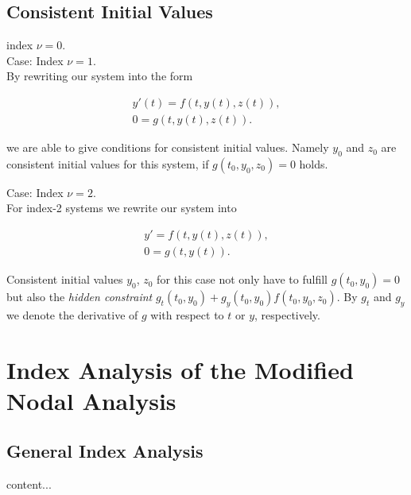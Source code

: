 	\subsection{Consistent Initial Values}
	\begin{frame}
		index $\nu = 0$.\\ 
		
		Case: Index $\nu = 1$.\\
		
			By rewriting our system into the form
			
			\begin{align*}
				y'(t) = f(t,y(t),z(t)), \\
				0 = g(t,y(t),z(t)).
			\end{align*}
			
			we are able to give conditions for consistent initial values. Namely $y_0$ and $z_0$ are consistent initial values for this system, if $g(t_0, y_0, z_0) = 0$ holds.
			
	\end{frame}

	\begin{frame}
		Case: Index $\nu = 2$.\\
		
		For index-2 systems we rewrite our system into
		
		\begin{align*}
			y' = f(t,y(t),z(t)), \\
			0 = g(t,y(t)).
		\end{align*}
		
		Consistent initial values $y_0$, $z_0$ for this case not only have to fulfill $g(t_0, y_0) = 0$ but also the \emph{hidden constraint} $g_t(t_0, y_0) + g_y(t_0, y_0)f(t_0, y_0, z_0)$. By $g_t$ and $g_y$ we denote the derivative of $g$ with respect to $t$ or $y$, respectively.
	\end{frame}

\section*{Index Analysis of the Modified Nodal Analysis}
	\subsection{General Index Analysis}
	\begin{frame}
		content...
	\end{frame}
